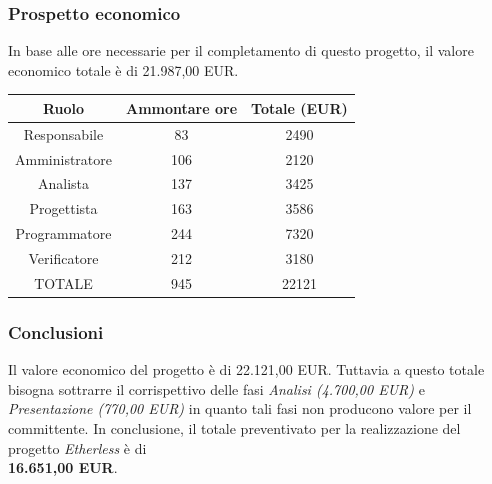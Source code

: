 \subsubsection{Prospetto economico}
In base alle ore necessarie per il completamento di questo progetto, il valore economico totale è di 21.987,00 EUR.
\begin{center}
\begin{tabular}{ |c|c|c|  }
 \hline
 Ruolo 		& Ammontare ore 	& Totale (EUR)\\
 \hline
 \hline
 	Responsabile	& 83 	& 2490\\
	Amministratore	& 106		& 2120\\
	Analista		& 137 		& 3425\\
	Progettista		& 163		& 3586\\
	Programmatore	& 244		& 7320\\
	Verificatore	& 212 	& 3180\\
 \hline\hline
 TOTALE		& 945		& 22121\\
  \hline
\end{tabular}
\end{center}

\subsubsection{Conclusioni}
Il valore economico del progetto è di 22.121,00 EUR. Tuttavia a questo totale bisogna sottrarre il corrispettivo delle fasi \textit{Analisi (4.700,00 EUR)} e \textit{Presentazione (770,00 EUR)} in quanto tali fasi non producono valore per il committente.
\newline
\newline
In conclusione, il totale preventivato per la realizzazione del progetto \textit{Etherless} è di\\ \textbf{16.651,00 EUR}.